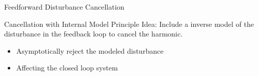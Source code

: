\documentclass[10pt]{beamer}
\begin{document}
\begin{frame}{Feedforward Disturbance Cancellation}
  \begin{figure}[h!]
    \centering %
    \qquad
  \end{figure}
\end{frame}

\begin{frame}{Cancellation with Internal Model Principle}
  \alert{Idea}: Include a inverse model of the disturbance in the feedback loop to cancel the harmonic.
  \begin{itemize}
    \item Asymptotically reject the modeled disturbance
    \item Affecting the closed loop system
  \end{itemize}
\end{frame}
\end{document}
